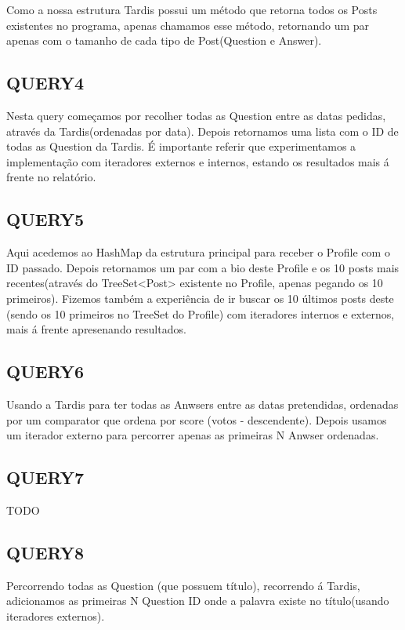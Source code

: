 \documentclass[letterpaper, 10 pt, conference]{IEEEtran}  %
\begin{document}
Como a nossa estrutura Tardis possui um método que retorna todos os Posts existentes no programa, apenas chamamos esse método,
retornando um par apenas com o tamanho de cada tipo de Post(Question e Answer).

\subsection{QUERY4}

Nesta query começamos por recolher todas as Question entre as datas pedidas, através da Tardis(ordenadas por data).
Depois retornamos uma lista com o ID de todas as Question da Tardis.
\newline
É importante referir que experimentamos a implementação com iteradores externos e internos, estando os resultados mais á frente
no relatório.

\subsection{QUERY5}

Aqui acedemos ao HashMap da estrutura principal para receber o Profile com o ID passado. Depois retornamos um par com a bio deste Profile e os
10 posts mais recentes(através do TreeSet<Post> existente no Profile, apenas pegando os 10 primeiros).
Fizemos também a experiência de ir buscar os 10 últimos posts deste (sendo os 10 primeiros no TreeSet do Profile) com
iteradores internos e externos, mais á frente apresenando resultados.

\subsection{QUERY6}

Usando a Tardis para ter todas as Anwsers entre as datas pretendidas, ordenadas por um comparator 
que ordena por score (votos - descendente). Depois usamos um iterador externo para percorrer apenas as primeiras N Anwser ordenadas.

\subsection{QUERY7}

TODO

\subsection{QUERY8}

Percorrendo todas as Question (que possuem título), recorrendo á Tardis, adicionamos as primeiras N Question ID onde a palavra
existe no título(usando iteradores externos).
\end{document}
